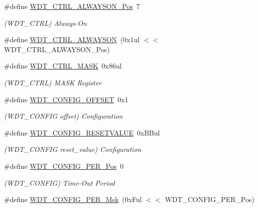 \begin{DoxyCompactItemize}
\item 
\#define \mbox{\hyperlink{group___s_a_m_d21___w_d_t_ga3a5e399d5fdcfd15ef16e4301352c99a}{W\+D\+T\+\_\+\+C\+T\+R\+L\+\_\+\+A\+L\+W\+A\+Y\+S\+O\+N\+\_\+\+Pos}}~7
\begin{DoxyCompactList}\small\item\em (W\+D\+T\+\_\+\+C\+T\+RL) Always-\/\+On \end{DoxyCompactList}\item 
\#define \mbox{\hyperlink{group___s_a_m_d21___w_d_t_ga0d7cb59dc5a756596dd5da71f95c497c}{W\+D\+T\+\_\+\+C\+T\+R\+L\+\_\+\+A\+L\+W\+A\+Y\+S\+ON}}~(0x1ul $<$$<$ W\+D\+T\+\_\+\+C\+T\+R\+L\+\_\+\+A\+L\+W\+A\+Y\+S\+O\+N\+\_\+\+Pos)
\item 
\#define \mbox{\hyperlink{group___s_a_m_d21___w_d_t_gac24b0b3ec8534ad7f0bc34a49ed46a0d}{W\+D\+T\+\_\+\+C\+T\+R\+L\+\_\+\+M\+A\+SK}}~0x86ul
\begin{DoxyCompactList}\small\item\em (W\+D\+T\+\_\+\+C\+T\+RL) M\+A\+SK Register \end{DoxyCompactList}\item 
\#define \mbox{\hyperlink{group___s_a_m_d21___w_d_t_ga0d3293445b10bdfdf733067d75f7b98c}{W\+D\+T\+\_\+\+C\+O\+N\+F\+I\+G\+\_\+\+O\+F\+F\+S\+ET}}~0x1
\begin{DoxyCompactList}\small\item\em (W\+D\+T\+\_\+\+C\+O\+N\+F\+IG offset) Configuration \end{DoxyCompactList}\item 
\#define \mbox{\hyperlink{group___s_a_m_d21___w_d_t_ga963315e6b2e0dfb513fb236eae8386b0}{W\+D\+T\+\_\+\+C\+O\+N\+F\+I\+G\+\_\+\+R\+E\+S\+E\+T\+V\+A\+L\+UE}}~0x\+B\+Bul
\begin{DoxyCompactList}\small\item\em (W\+D\+T\+\_\+\+C\+O\+N\+F\+IG reset\+\_\+value) Configuration \end{DoxyCompactList}\item 
\#define \mbox{\hyperlink{group___s_a_m_d21___w_d_t_ga55662a2fa7e16fd6cc7a5e0800034360}{W\+D\+T\+\_\+\+C\+O\+N\+F\+I\+G\+\_\+\+P\+E\+R\+\_\+\+Pos}}~0
\begin{DoxyCompactList}\small\item\em (W\+D\+T\+\_\+\+C\+O\+N\+F\+IG) Time-\/\+Out Period \end{DoxyCompactList}\item 
\#define \mbox{\hyperlink{group___s_a_m_d21___w_d_t_ga7b17345103d170e4fc578db43ad0987e}{W\+D\+T\+\_\+\+C\+O\+N\+F\+I\+G\+\_\+\+P\+E\+R\+\_\+\+Msk}}~(0x\+Ful $<$$<$ W\+D\+T\+\_\+\+C\+O\+N\+F\+I\+G\+\_\+\+P\+E\+R\+\_\+\+Pos)

\end{DoxyCompactItemize}

